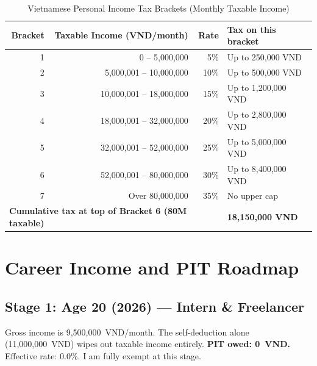 \begin{table}[h!]
\caption{Vietnamese Personal Income Tax Brackets (Monthly Taxable Income)}
\label{tab:pit_brackets}
\begin{tabularx}{\linewidth}{@{}rrrX@{}}
\toprule
\textbf{Bracket} & \textbf{Taxable Income (VND/month)} & \textbf{Rate} & \textbf{Tax on this bracket} \\
\midrule
1 & 0 -- 5,000,000            & 5\%  & Up to 250,000 VND \\
2 & 5,000,001 -- 10,000,000   & 10\% & Up to 500,000 VND \\
3 & 10,000,001 -- 18,000,000  & 15\% & Up to 1,200,000 VND \\
4 & 18,000,001 -- 32,000,000  & 20\% & Up to 2,800,000 VND \\
5 & 32,000,001 -- 52,000,000  & 25\% & Up to 5,000,000 VND \\
6 & 52,000,001 -- 80,000,000  & 30\% & Up to 8,400,000 VND \\
7 & Over 80,000,000           & 35\% & No upper cap \\
\midrule
\multicolumn{3}{l}{\textbf{Cumulative tax at top of Bracket 6 (80M taxable)}} & \textbf{18,150,000 VND} \\
\bottomrule
\end{tabularx}
\end{table}



\section{Career Income and PIT Roadmap}

\subsection{Stage 1: Age 20 (2026) --- Intern \& Freelancer}
Gross income is 9,500,000~VND/month. The self-deduction alone (11,000,000~VND) wipes out taxable income entirely. \textbf{PIT owed: 0~VND.} Effective rate: 0.0\%. I am fully exempt at this stage.

